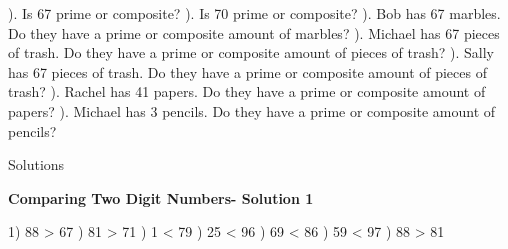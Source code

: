\documentclass{article}%
\begin{document}
\newline%
\newline%
). Is 67 prime or composite?%
\newline%
\newline%
). Is 70 prime or composite?%
\newline%
\newline%
). Bob has 67 marbles. Do they have a prime or composite amount of marbles?%
\newline%
\newline%
). Michael has 67 pieces of trash. Do they have a prime or composite amount of pieces of trash?%
\newline%
\newline%
). Sally has 67 pieces of trash. Do they have a prime or composite amount of pieces of trash?%
\newline%
\newline%
). Rachel has 41 papers. Do they have a prime or composite amount of papers?%
\newline%
\newline%
). Michael has 3 pencils. Do they have a prime or composite amount of pencils?%
\newline%
\newline%
\newline%
\pagebreak%
\huge%
\vspace*{\fill}%
\begin{center}%
Solutions%
\end{center}%
\vspace*{\fill}%
\normalsize%
\pagebreak%
\large%
\begin{center}%
\textbf{Comparing Two Digit Numbers- Solution 1}%
\newline%
\end{center} \normalsize%
1) 88 > 67%
) 81 > 71%
) 1 < 79%
) 25 < 96%
) 69 < 86%
) 59 < 97%
) 88 > 81%
\newline%
\end{document}
